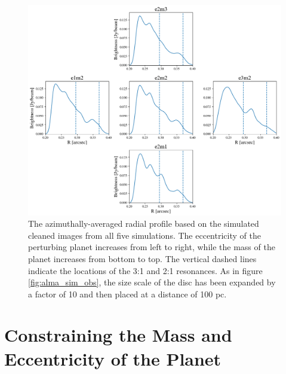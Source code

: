 \documentclass[fleqn,usenatbib]{mnras}
\begin{document}
\begin{figure}
    \includegraphics[width=\textwidth]{figures/alma_profiles.png}
    \caption{The azimuthally-averaged radial profile based on the simulated cleaned images from all five simulations. The eccentricity of the perturbing planet increases from left to right, 
    while the mass of the planet increases from bottom to top. The vertical dashed lines indicate the locations of the 3:1 and 2:1 resonances. As in figure \ref{fig:alma_sim_obs}, the size 
    scale of the disc has been expanded by a factor of 10 and then placed at a distance of 100 pc.\label{fig:alma_profiles}}
\end{figure}

\section{Constraining the Mass and Eccentricity of the Planet}\label{sec:constrain}
\end{document}
